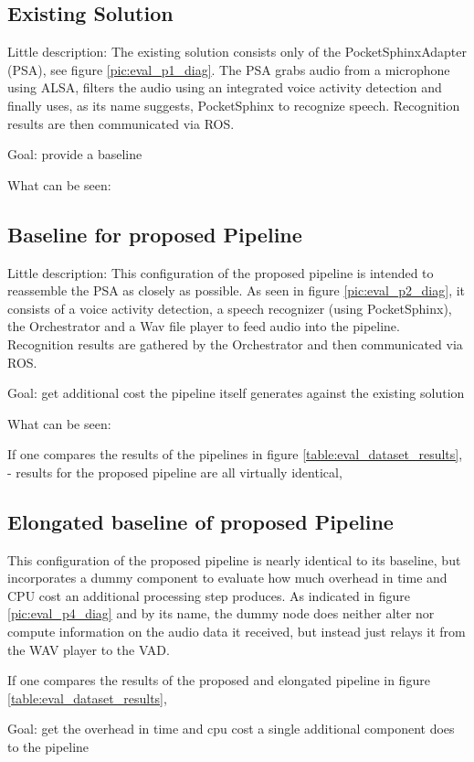 \subsection{Existing Solution}
Little description:
The existing solution consists only of the PocketSphinxAdapter (PSA), see figure \ref{pic:eval_p1_diag}.
The PSA grabs audio from a microphone using ALSA, filters the audio using an integrated voice activity detection and finally uses, as its name suggests, PocketSphinx to recognize speech.
Recognition results are then communicated via ROS.

Goal: provide a baseline

What can be seen: 

\subsection{Baseline for proposed Pipeline}
Little description:
This configuration of the proposed pipeline is intended to reassemble the PSA as closely as possible.
As seen in figure \ref{pic:eval_p2_diag}, it consists of a voice activity detection, a speech recognizer (using PocketSphinx), the Orchestrator and a Wav file player to feed audio into the pipeline.
Recognition results are gathered by the Orchestrator and then communicated via ROS.

Goal: get additional cost the pipeline itself generates against the existing solution

What can be seen: 

If one compares the results of the pipelines in figure \ref{table:eval_dataset_results}, 
- results for the proposed pipeline are all virtually identical, 


\subsection{Elongated baseline of proposed Pipeline}
This configuration of the proposed pipeline is nearly identical to its baseline, but incorporates a dummy component to evaluate how much overhead in time and CPU cost an additional processing step produces.
As indicated in figure \ref{pic:eval_p4_diag} and by its name, the dummy node does neither alter nor compute information on the audio data it received, but instead just relays it from the WAV player to the VAD.

If one compares the results of the proposed and elongated pipeline in figure \ref{table:eval_dataset_results}, 

Goal: get the overhead in time and cpu cost a single additional component does to the pipeline

